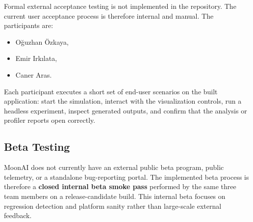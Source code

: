 Formal external acceptance testing is not implemented in the repository. The current user
acceptance process is therefore internal and manual. The participants are:

\begin{itemize}[nosep]
	\item Oğuzhan Özkaya,
	\item Emir Irkılata,
	\item Caner Aras.
\end{itemize}

Each participant executes a short set of end-user scenarios on the built application: start
the simulation, interact with the visualization controls, run a headless experiment, inspect
generated outputs, and confirm that the analysis or profiler reports open correctly.

\subsection{Beta Testing}

MoonAI does not currently have an external public beta program, public telemetry, or a
standalone bug-reporting portal. The implemented beta process is therefore a \textbf{closed
	internal beta smoke pass} performed by the same three team members on a release-candidate
build. This internal beta focuses on regression detection and platform sanity rather than
large-scale external feedback.
